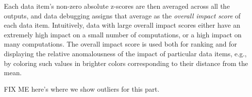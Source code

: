 Each data item's non-zero absolute z-scores are then averaged across
all the outputs, and data debugging assigns that average as the
\emph{overall impact score} of each data item. Intuitively, data with
large overall impact scores either have an extremely high impact on a
small number of computations, or a high impact on many
computations. The overall impact score is used both for ranking and
for displaying the relative anomalousness of the impact of particular
data items, e.g., by coloring such values in brighter colors
corresponding to their distance from the mean.

FIX ME here's where we show outliers for this part.




